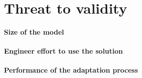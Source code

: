 \section{Threat to validity}
\label{sec:tkm:threat2Valid}

\paragraph{Size of the model}

\paragraph{Engineer effort to use the solution}

\paragraph{Performance of the adaptation process}